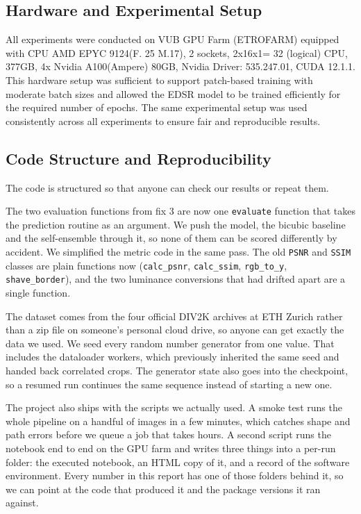 \documentclass[a4paper,11pt]{article}
\begin{document}
\subsection{Hardware and Experimental Setup}

All experiments were conducted on VUB GPU Farm (ETROFARM)  equipped
with CPU AMD EPYC 9124(F. 25 M.17), 2 sockets, 2x16x1= 32 (logical) CPU, 377GB, 4x Nvidia A100(Ampere) 80GB, Nvidia Driver: 535.247.01, CUDA 12.1.1. This hardware setup was sufficient to support patch-based training
with moderate batch sizes and allowed the EDSR model to be trained efficiently for
the required number of epochs. The same experimental setup was used consistently
across all experiments to ensure fair and reproducible results.

\subsection{Code Structure and Reproducibility}

The code is structured so that anyone can check our results or repeat them.

\medskip

The two evaluation functions from fix 3 are now one \texttt{evaluate} function that takes the
prediction routine as an argument. We push the model, the bicubic baseline and the self-ensemble
through it, so none of them can be scored differently by accident. We simplified the metric code
in the same pass. The old \texttt{PSNR} and \texttt{SSIM} classes are plain functions now
(\texttt{calc\_psnr}, \texttt{calc\_ssim}, \texttt{rgb\_to\_y}, \texttt{shave\_border}), and
the two luminance conversions that had drifted apart are a single function.

\medskip

The dataset comes from the four official DIV2K archives at ETH Zurich rather than a zip file on
someone's personal cloud drive, so anyone can get exactly the data we used. We seed every random
number generator from one value. That includes the dataloader workers, which previously inherited
the same seed and handed back correlated crops. The generator state also goes into the checkpoint,
so a resumed run continues the same sequence instead of starting a new one.

\medskip

The project also ships with the scripts we actually used. A smoke test runs the whole pipeline on
a handful of images in a few minutes, which catches shape and path errors before we queue a job
that takes hours. A second script runs the notebook end to end on the GPU farm and writes three
things into a per-run folder: the executed notebook, an HTML copy of it, and a record of the
software environment. Every number in this report has one of those folders behind it, so we can
point at the code that produced it and the package versions it ran against.
\end{document}
